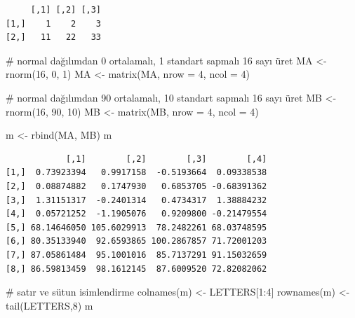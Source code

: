 \documentclass[
  letterpaper,
  DIV=11,
  numbers=noendperiod]{scrreprt}
\newenvironment{Shaded}{\begin{snugshade}}{\end{snugshade}}
\newcommand{\AttributeTok}[1]{\textcolor[rgb]{0.40,0.45,0.13}{#1}}
\newcommand{\CommentTok}[1]{\textcolor[rgb]{0.37,0.37,0.37}{#1}}
\newcommand{\DecValTok}[1]{\textcolor[rgb]{0.68,0.00,0.00}{#1}}
\newcommand{\FunctionTok}[1]{\textcolor[rgb]{0.28,0.35,0.67}{#1}}
\newcommand{\NormalTok}[1]{\textcolor[rgb]{0.00,0.23,0.31}{#1}}
\newcommand{\OtherTok}[1]{\textcolor[rgb]{0.00,0.23,0.31}{#1}}
\newcommand{\SpecialCharTok}[1]{\textcolor[rgb]{0.37,0.37,0.37}{#1}}
\begin{document}
\begin{verbatim}
     [,1] [,2] [,3]
[1,]    1    2    3
[2,]   11   22   33
\end{verbatim}

\begin{Shaded}
\begin{Highlighting}[]
\CommentTok{\# normal dağılımdan 0 ortalamalı, 1 standart sapmalı 16 sayı üret}
\NormalTok{MA }\OtherTok{\textless{}{-}} \FunctionTok{rnorm}\NormalTok{(}\DecValTok{16}\NormalTok{, }\DecValTok{0}\NormalTok{, }\DecValTok{1}\NormalTok{)}
\NormalTok{MA }\OtherTok{\textless{}{-}} \FunctionTok{matrix}\NormalTok{(MA, }\AttributeTok{nrow =} \DecValTok{4}\NormalTok{, }\AttributeTok{ncol =} \DecValTok{4}\NormalTok{)}

\CommentTok{\# normal dağılımdan 90 ortalamalı, 10 standart sapmalı 16 sayı üret}
\NormalTok{MB }\OtherTok{\textless{}{-}} \FunctionTok{rnorm}\NormalTok{(}\DecValTok{16}\NormalTok{, }\DecValTok{90}\NormalTok{, }\DecValTok{10}\NormalTok{)}
\NormalTok{MB }\OtherTok{\textless{}{-}} \FunctionTok{matrix}\NormalTok{(MB, }\AttributeTok{nrow =} \DecValTok{4}\NormalTok{, }\AttributeTok{ncol =} \DecValTok{4}\NormalTok{)}

\NormalTok{m }\OtherTok{\textless{}{-}} \FunctionTok{rbind}\NormalTok{(MA, MB)}
\NormalTok{m}
\end{Highlighting}
\end{Shaded}

\begin{verbatim}
            [,1]        [,2]        [,3]        [,4]
[1,]  0.73923394   0.9917158  -0.5193664  0.09338538
[2,]  0.08874882   0.1747930   0.6853705 -0.68391362
[3,]  1.31151317  -0.2401314   0.4734317  1.38884232
[4,]  0.05721252  -1.1905076   0.9209800 -0.21479554
[5,] 68.14646050 105.6029913  78.2482261 68.03748595
[6,] 80.35133940  92.6593865 100.2867857 71.72001203
[7,] 87.05861484  95.1001016  85.7137291 91.15032659
[8,] 86.59813459  98.1612145  87.6009520 72.82082062
\end{verbatim}

\begin{Shaded}
\begin{Highlighting}[]
\CommentTok{\# satır ve sütun isimlendirme}
\FunctionTok{colnames}\NormalTok{(m) }\OtherTok{\textless{}{-}}\NormalTok{ LETTERS[}\DecValTok{1}\SpecialCharTok{:}\DecValTok{4}\NormalTok{]}
\FunctionTok{rownames}\NormalTok{(m) }\OtherTok{\textless{}{-}} \FunctionTok{tail}\NormalTok{(LETTERS,}\DecValTok{8}\NormalTok{)}
\NormalTok{m}
\end{Highlighting}
\end{Shaded}
\end{document}
